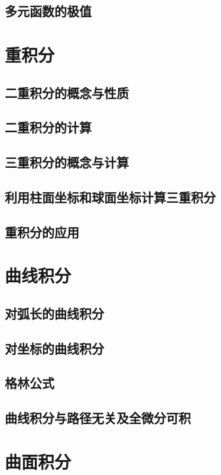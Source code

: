 \documentclass[lang=cn,10pt]{elegantbook}
\begin{document}
\section{多元函数的极值}





\chapter{重积分}
\section{二重积分的概念与性质}
\section{二重积分的计算}
\section{三重积分的概念与计算}
\section{利用柱面坐标和球面坐标计算三重积分}
\section{重积分的应用}



\chapter{曲线积分}
\section{对弧长的曲线积分}
\section{对坐标的曲线积分}
\section{格林公式}
\section{曲线积分与路径无关及全微分可积}



\chapter{曲面积分}
\end{document}
